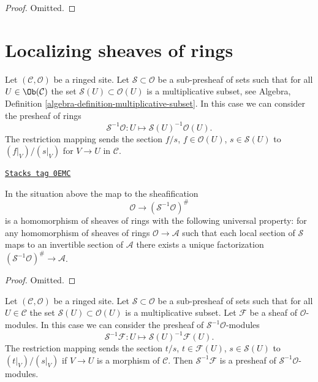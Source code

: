 \begin{proof}
Omitted.
\end{proof}

\section{Localizing sheaves of rings}
\label{sites-modules-section-localizing-sheaves-rings}
Let $(\mathcal{C}, \mathcal{O})$ be a ringed site.
Let $\mathcal{S} \subset \mathcal{O}$ be a sub-presheaf of sets
such that for all $U \in \Ob(\mathcal{C})$ the set
$\mathcal{S}(U) \subset \mathcal{O}(U)$ is a multiplicative subset, see
Algebra, Definition \ref{algebra-definition-multiplicative-subset}.
In this case we can consider the presheaf of rings
$$
\mathcal{S}^{-1}\mathcal{O} :
U \longmapsto \mathcal{S}(U)^{-1}\mathcal{O}(U).
$$
The restriction mapping sends the section
$f/s$, $f \in \mathcal{O}(U)$, $s \in \mathcal{S}(U)$
to $(f|_V)/(s|_V)$ for $V \to U$ in $\mathcal{C}$.

\begin{lemma}
\label{sites-modules-lemma-simple-invert}
\href{https://stacks.math.columbia.edu/tag/0EMC}{\texttt{Stacks tag 0EMC}}

In the situation above the map to the sheafification
$$
\mathcal{O} \longrightarrow (\mathcal{S}^{-1}\mathcal{O})^\#
$$
is a homomorphism of sheaves of rings with the following
universal property: for any homomorphism of sheaves of rings
$\mathcal{O} \to \mathcal{A}$ such that each local section
of $\mathcal{S}$ maps to an invertible section of $\mathcal{A}$
there exists a unique factorization
$(\mathcal{S}^{-1}\mathcal{O})^\# \to \mathcal{A}$.
\end{lemma}

\begin{proof}
Omitted.
\end{proof}

Let $(\mathcal{C}, \mathcal{O})$ be a ringed site.
Let $\mathcal{S} \subset \mathcal{O}$
be a sub-presheaf of sets such that for all $U \in \mathcal{C}$ the set
$\mathcal{S}(U) \subset \mathcal{O}(U)$ is a multiplicative subset.
Let $\mathcal{F}$ be a sheaf of $\mathcal{O}$-modules.
In this case we can consider the presheaf of
$\mathcal{S}^{-1}\mathcal{O}$-modules
$$
\mathcal{S}^{-1}\mathcal{F} :
U \longmapsto \mathcal{S}(U)^{-1}\mathcal{F}(U).
$$
The restriction mapping sends the section $t/s$, $t \in \mathcal{F}(U)$,
$s \in \mathcal{S}(U)$ to $(t|_V)/(s|_V)$ if $V \to U$ is a morphism
of $\mathcal{C}$. Then $\mathcal{S}^{-1}\mathcal{F}$ is a presheaf
of $\mathcal{S}^{-1}\mathcal{O}$-modules.

